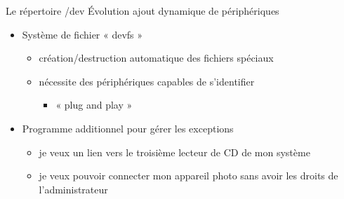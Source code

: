 \begin {frame} {Le répertoire /dev}
    Évolution \implique ajout dynamique de périphériques

    \begin {itemize}

	\item Système de fichier « devfs »

	    \begin {itemize}
		\item création/destruction automatique des fichiers spéciaux
		\item nécessite des périphériques capables de s'identifier
		    \begin {itemize}
			\item « plug and play »
		    \end {itemize}
	    \end {itemize}

	\item Programme additionnel pour gérer les exceptions

	    \begin {itemize}
		\item je veux un lien  vers le
		    troisième lecteur de CD de mon système

		\item je veux pouvoir connecter mon appareil photo
		    sans avoir les droits de l'administrateur
	    \end {itemize}
    \end {itemize}
\end {frame}
